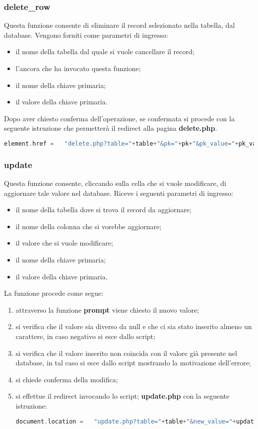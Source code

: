 \subsubsection{delete\_row}
Questa funzione consente di eliminare il record selezionato nella tabella, dal database. Vengono forniti come parametri di ingresso:
\begin{itemize}
\item il nome della tabella dal quale si vuole cancellare il record;
\item l'ancora che ha invocato questa funzione;
\item il nome della chiave primaria;
\item il valore della chiave primaria.
\end{itemize}
Dopo aver chiesto conferma dell'operazione, se confermata si procede con la seguente istruzione che permetterà il redirect alla pagina \textbf{delete.php}.
\begin{lstlisting}[language=PHP]
element.href =   "delete.php?table="+table+"&pk="+pk+"&pk_value="+pk_value;
\end{lstlisting}

\subsubsection{update}
Questa funzione consente, cliccando sulla cella che si vuole modificare, di aggiornare tale valore nel database.
Riceve i seguenti parametri di ingresso:
\begin{itemize}
\item il nome della tabella dove si trova il record da aggiornare;
\item il nome della colonna che si vorebbe aggiornare;
\item il valore che si vuole modificare;
\item il nome della chiave primaria;
\item il valore della chiave primaria.
\end{itemize}
La funzione procede come segue:
\begin{enumerate}
\item attraverso la funzione \textbf{prompt} viene chiesto il nuovo valore;
\item si verifica che il valore sia diverso da null e che ci sia stato inserito almeno un carattere, in caso negativo si esce dallo script;
\item si verifica che il valore inserito non coincida con il valore già presente nel database, in tal caso si esce dallo script mostrando la motivazione dell'errore;
\item si chiede conferma della modifica;
\item si effettue il redirect invocando lo script; \textbf{update.php} con la seguente istruzione:
\begin{lstlisting}[language=PHP]
 document.location =   "update.php?table="+table+"&new_value="+update+"&column="+column+"&pk="+pk+"&pk_value="+pk_value ;
\end{lstlisting}

\end{enumerate}

